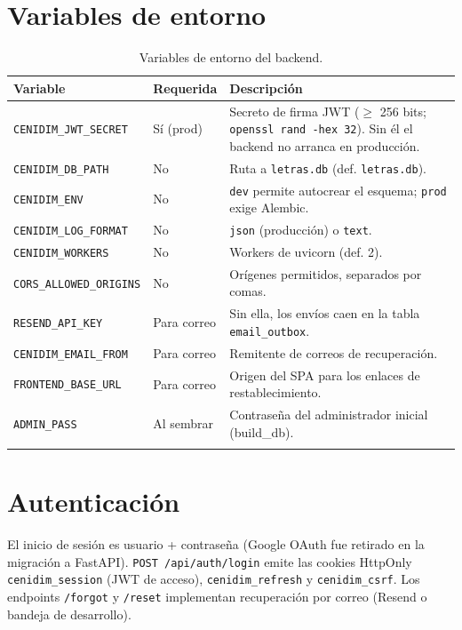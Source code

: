 \documentclass[11pt,letterpaper,twoside]{report}
\newcommand{\codigo}[1]{\texttt{#1}}
\begin{document}
\section{Variables de entorno}
\begin{longtable}{p{5.2cm}p{2.1cm}p{7.2cm}}
  \toprule
  \textbf{Variable} & \textbf{Requerida} & \textbf{Descripción} \\
  \midrule
  \endhead
  \codigo{CENIDIM_JWT_SECRET} & Sí (prod) &
    Secreto de firma JWT ($\ge$ 256 bits;
    \codigo{openssl rand -hex 32}). Sin él el backend no arranca en
    producción. \\
  \codigo{CENIDIM_DB_PATH} & No & Ruta a \codigo{letras.db}
    (def. \codigo{letras.db}). \\
  \codigo{CENIDIM_ENV} & No & \codigo{dev} permite autocrear el
    esquema; \codigo{prod} exige Alembic. \\
  \codigo{CENIDIM_LOG_FORMAT} & No & \codigo{json} (producción) o
    \codigo{text}. \\
  \codigo{CENIDIM_WORKERS} & No & Workers de uvicorn (def. 2). \\
  \codigo{CORS_ALLOWED_ORIGINS} & No & Orígenes permitidos,
    separados por comas. \\
  \codigo{RESEND_API_KEY} & Para correo & Sin ella, los envíos caen en
    la tabla \codigo{email_outbox}. \\
  \codigo{CENIDIM_EMAIL_FROM} & Para correo & Remitente de correos de
    recuperación. \\
  \codigo{FRONTEND_BASE_URL} & Para correo & Origen del SPA para los
    enlaces de restablecimiento. \\
  \codigo{ADMIN_PASS} & Al sembrar & Contraseña del administrador
    inicial (build_db). \\
  \bottomrule
  \caption{Variables de entorno del backend.}
  \label{tab:envvars}
\end{longtable}

\section{Autenticación}
El inicio de sesión es usuario + contraseña (Google OAuth fue retirado
en la migración a FastAPI). \codigo{POST /api/auth/login} emite las
cookies HttpOnly \codigo{cenidim_session} (JWT de acceso),
\codigo{cenidim_refresh} y \codigo{cenidim_csrf}. Los endpoints
\codigo{/forgot} y \codigo{/reset} implementan recuperación por correo
(Resend o bandeja de desarrollo).
\end{document}

